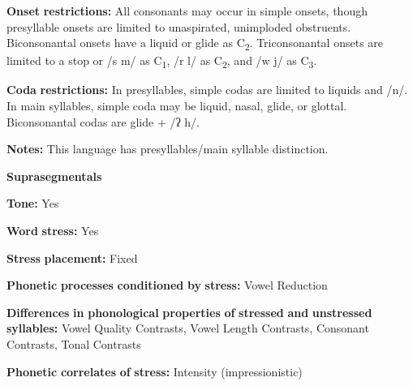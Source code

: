 \documentclass[output=paper]{langsci/langscibook}
\begin{document}
\begin{styleBody}
\textbf{Onset} \textbf{restrictions:} All consonants may occur in simple onsets, though presyllable onsets are limited to unaspirated, unimploded obstruents. Biconsonantal onsets have a liquid or glide as C\textsubscript{2}. Triconsonantal onsets are limited to a stop or /s m/ as C\textsubscript{1}, /r l/ as C\textsubscript{2}, and /w j/ as C\textsubscript{3}.
\end{styleBody}

\begin{styleBody}
\textbf{Coda} \textbf{restrictions:} In presyllables, simple codas are limited to liquids and /n/. In main syllables, simple coda may be liquid, nasal, glide, or glottal. Biconsonantal codas are glide + /ʔ h/.
\end{styleBody}

\begin{styleBody}
\textbf{Notes:} This language has presyllables/main syllable distinction.
\end{styleBody}

\begin{styleBody}
\textbf{Suprasegmentals}
\end{styleBody}

\begin{styleBody}
\textbf{Tone:} Yes
\end{styleBody}

\begin{styleBody}
\textbf{Word} \textbf{stress:} Yes
\end{styleBody}

\begin{styleBody}
\textbf{Stress} \textbf{placement:} Fixed
\end{styleBody}

\begin{styleBody}
\textbf{Phonetic} \textbf{processes} \textbf{conditioned} \textbf{by} \textbf{stress:} Vowel Reduction
\end{styleBody}

\begin{styleBody}
\textbf{Differences} \textbf{in} \textbf{phonological} \textbf{properties} \textbf{of} \textbf{stressed} \textbf{and} \textbf{unstressed} \textbf{syllables:} Vowel Quality Contrasts, Vowel Length Contrasts, Consonant Contrasts, Tonal Contrasts
\end{styleBody}

\begin{styleBody}
\textbf{Phonetic} \textbf{correlates} \textbf{of} \textbf{stress:} Intensity (impressionistic)
\end{styleBody}
\end{document}
